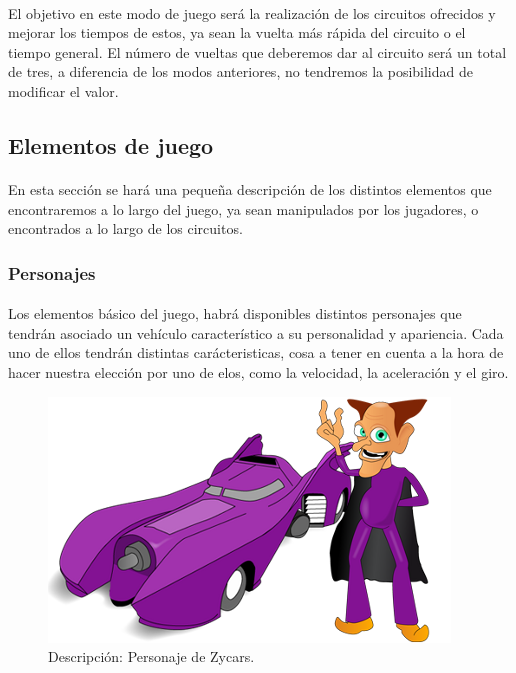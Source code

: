 \paragraph{}
El objetivo en este modo de juego será la realización de los circuitos ofrecidos y mejorar los tiempos de estos, ya sean la 
vuelta más rápida del circuito o el tiempo general. El número de vueltas que deberemos dar al circuito será un total de tres, a
diferencia de los modos anteriores, no tendremos la posibilidad de modificar el valor.

\subsection{Elementos de juego}

\paragraph{}
En esta sección se hará una pequeña descripción de los distintos elementos que encontraremos a lo largo del juego, ya sean 
manipulados por los jugadores, o encontrados a lo largo de los circuitos.

\subsubsection{Personajes}
	
\paragraph{}
Los elementos básico del juego, habrá disponibles distintos personajes que tendrán asociado un 
vehículo característico a su personalidad y apariencia. Cada uno de ellos tendrán distintas carácteristicas, 
cosa a tener en cuenta a la hora de hacer nuestra elección por uno de elos, como la velocidad, la aceleración y el giro.
	
\begin{figure}[H]
	\label{ejemplo_personaje2}
	\begin{center}
		\includegraphics[scale=0.7]{imagenes/ejemplo_personaje2.png}
	\end{center}
	\caption{Descripción: Personaje de Zycars.}
\end{figure}

